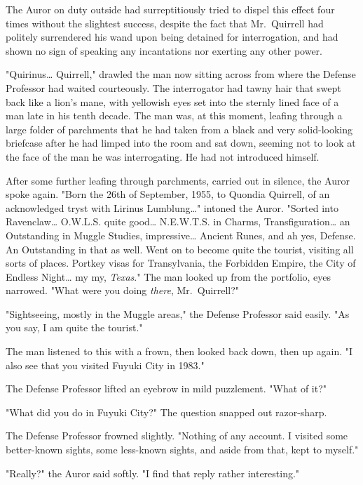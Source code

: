 The Auror on duty outside had surreptitiously tried to dispel this effect four 
times without the slightest success, despite the fact that Mr.~Quirrell had 
politely surrendered his wand upon being detained for interrogation, and had 
shown no sign of speaking any incantations nor exerting any other power.

"Quirinus{\ldots} Quirrell," drawled the man now sitting across from where the 
Defense Professor had waited courteously. The interrogator had tawny hair that 
swept back like a lion's mane, with yellowish eyes set into the sternly lined 
face of a man late in his tenth decade. The man was, at this moment, leafing 
through a large folder of parchments that he had taken from a black and very 
solid-looking briefcase after he had limped into the room and sat down, seeming 
not to look at the face of the man he was interrogating. He had not introduced 
himself.

After some further leafing through parchments, carried out in silence, the 
Auror spoke again. "Born the 26th of September, 1955, to Quondia Quirrell, of 
an acknowledged tryst with Lirinus Lumblung{\ldots}" intoned the Auror. "Sorted 
into Ravenclaw{\ldots} O.W.L.S. quite good{\ldots} N.E.W.T.S. in Charms, 
Transfiguration{\ldots} an Outstanding in Muggle Studies, impressive{\ldots} 
Ancient Runes, and ah yes, Defense. An Outstanding in that as well. Went on to 
become quite the tourist, visiting all sorts of places. Portkey visas for 
Transylvania, the Forbidden Empire, the City of Endless Night{\ldots} my my, 
\emph{Texas}." The man looked up from the portfolio, eyes narrowed. "What were 
you doing \emph{there}, Mr.~Quirrell?"

"Sightseeing, mostly in the Muggle areas," the Defense Professor said easily. 
"As you say, I am quite the tourist."

The man listened to this with a frown, then looked back down, then up again. "I 
also see that you visited Fuyuki City in 1983."

The Defense Professor lifted an eyebrow in mild puzzlement. "What of it?"

"What did you do in Fuyuki City?" The question snapped out razor-sharp.

The Defense Professor frowned slightly. "Nothing of any account. I visited some 
better-known sights, some less-known sights, and aside from that, kept to 
myself."

"Really?" the Auror said softly. "I find that reply rather interesting."

